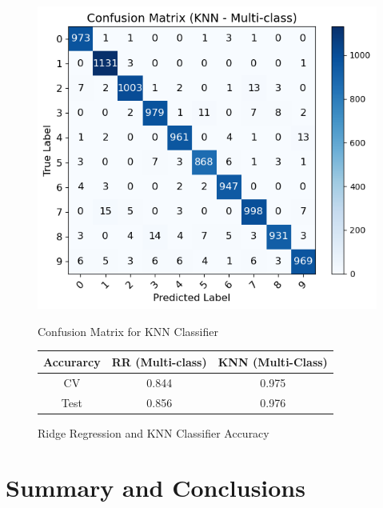 \documentclass[11pt]{amsart}
\begin{document}
\begin{figure}[htbp]
    \centering
    \begin{minipage}[b]{0.45\textwidth}
        \centering
        \includegraphics[width=\textwidth]{ConfusionKNN.png}  %
        \caption{Confusion Matrix for KNN Classifier}
        \label{fig:KNN_Confusion}
    \end{minipage}
    \hfill
    \begin{minipage}[b]{0.45\textwidth}
        \centering
        \begin{tabular}{c|c|c}
            \hline
            Accurarcy & RR (Multi-class) & KNN (Multi-Class) \\
            \hline
            CV & 0.844 & 0.975 \\
            Test & 0.856 & 0.976 \\
            \hline
        \end{tabular}
        \caption{Ridge Regression and KNN Classifier Accuracy}
        \label{tab:mytable}
    \end{minipage}
\end{figure}



\section*{Summary and Conclusions}
\end{document}
